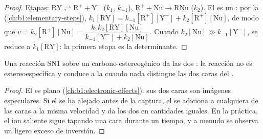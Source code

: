 \begin{proof}
Etapas: $\mathrm{RY} \rightleftharpoons \mathrm{R^+} + \mathrm{Y^-}$ ($k_1$,
$k_{-1}$), $\mathrm{R^+} + \mathrm{Nu} \to \mathrm{RNu}$ ($k_2$). El
 es un : por la  (\cref{ch:b1:elementary-steps}), $k_1[\mathrm{RY}] =
k_{-1}[\mathrm{R^+}][\mathrm{Y^-}] + k_2[\mathrm{R^+}][\mathrm{Nu}]$, de
modo que
$v = k_2[\mathrm{R^+}][\mathrm{Nu}] = \dfrac{k_1k_2[\mathrm{RY}][\mathrm{Nu}]}
{k_{-1}[\mathrm{Y^-}] + k_2[\mathrm{Nu}]}$. Cuando $k_2[\mathrm{Nu}] \gg
k_{-1}[\mathrm{Y^-}]$, se reduce a $k_1[\mathrm{RY}]$: la primera etapa es
la determinante.
\end{proof}

\begin{proposition}[Estereoquímica de la SN1]\label{prop:b1:nucleophilic-substitution:sn1-stereo}
Una reacción SN1 sobre un carbono estereogénico da las dos
: la reacción no es estereoespecífica y conduce a la
 cuando nada distingue las dos caras del .
\end{proposition}

\begin{proof}
El  es plano (\cref{ch:b1:electronic-effects}): sus dos caras
son imágenes especulares. Si el  se ha alejado antes de la
captura, el  se adiciona a cualquiera de las caras a la misma
velocidad y da los dos  en cantidades iguales. En la
práctica, el ion saliente sigue tapando una cara durante un tiempo, y a
menudo se observa un ligero exceso de inversión.
\end{proof}

